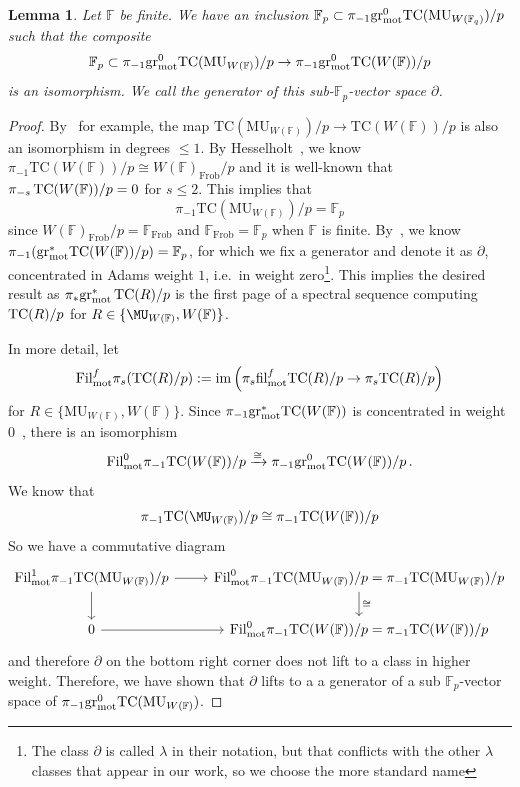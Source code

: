 \documentclass[english,10pt]{amsart}
\newcommand{\field}{\mathbb{F}}
\newtheorem{lemm}{Lemma}[section]
\theoremstyle{definition}
\numberwithin{equation}{section}
\newcommand{\mot}{\textup{mot}}
\DeclareMathOperator{\tc}{\ensuremath{\textup{TC}}}
\newcommand{\Fil}{\mathrm{Fil}}
\newcommand{\grmot}{\mathrm{gr}_{\textup{mot}}^*}
\newcommand{\pis}{\pi_*}
\begin{document}
\begin{lemm}\label{lem-partial}
Let $\mathbb{F}$ be finite. 
We have an inclusion 
$\field_p\subset \pi_{-1}\mathrm{gr}_{\textup{mot}}^0\mathrm{TC}(\mathrm{MU}_{W(\field_q)})/p$ such that the composite 
\[\field_p\subset \pi_{-1}\mathrm{gr}_{\textup{mot}}^0\mathrm{TC}(\mathrm{MU}_{W(\field)})/p\to \pi_{-1}\mathrm{gr}_{\textup{mot}}^0\mathrm{TC}(W(\field))/p\]
is an isomorphism. We call the generator of this sub-$\mathbb{F}_p$-vector space $\partial$. 
\end{lemm}
\begin{proof}
By~\cite[Proposition~3.22]{Kee25} for example, the map $\mathrm{TC}(\mathrm{MU}_{W(\field)})/p\to \mathrm{TC}(W(\field))/p$ is also an isomorphism in degrees $\le 1$. By Hesselholt~\cite[Theorem~A]{Hes97}, we know $\pi_{-1}\mathrm{TC}(W(\field))/p\cong W(\field)_{\mathrm{Frob}}/p$ and it is well-known that $\pi_{-s} \tc(W(\field))/p = 0$ for $s\le 2$. This implies that \[\pi_{-1}\mathrm{TC}(\mathrm{MU}_{W(\field)})/p=\mathbb{F}_p\]
since $W(\field)_{\mathrm{Frob}}/p=\mathbb{F}_{\mathrm{Frob}}$ and $\mathbb{F}_{\mathrm{Frob}}=\mathbb{F}_p$ when $\mathbb{F}$ is finite. By~\cite[Theorem~1.5]{LW22}, we know $\pi_{-1}(\grmot\mathrm{TC}(W(\field))/p)=\mathbb{F}_p$, for which we fix a generator and denote it  as $\partial$, concentrated in Adams weight $1$, i.e.\ in weight zero\footnote{The class $\partial$ is called $\lambda$ in their notation, but that conflicts with the other $\lambda$ classes that appear in our work, so we choose the more standard name}. This implies the desired result as $\pis \grmot \tc(R)/p$ is the first page of a spectral sequence computing $\tc(R)/p$ for $R \in \{\MU_{W(\field)}, W(\field)\}$. 

In more detail, let 
\[ 
\mathrm{Fil}_{\mot}^{f}\pi_s(\mathrm{TC}(R)/p) := \mathrm{im}\left (\pi_s\mathrm{fil}_{\textup{mot}}^f \mathrm{TC}(R)/p\to \pi_s\mathrm{TC}(R)/p\right ) \]
for $R\in \{ \mathrm{MU}_{W(\field)}, W(\field)\}$. 
Since $\pi_{-1}\grmot\mathrm{TC}(W(\field))$ is concentrated in weight $0$~\cite[Theorem~1.5]{LW22}, there is an isomorphism
\[ 
\mathrm{Fil}_{\textup{mot}}^0\pi_{-1}\mathrm{TC}(W(\field))/p\xrightarrow{\cong} \pi_{-1}\mathrm{gr}_{\textup{mot}}^0\mathrm{TC}(W(\field))/p\,.
\] 
We know that 
\[ 
\pi_{-1}\mathrm{TC}(\MU_{W(\field)})/p\cong \pi_{-1}\mathrm{TC}(W(\field))/p
\]
So we have a commutative diagram 
\[ 
\begin{tikzcd}
\Fil_{\mot}^1\pi_{-1}\mathrm{TC}(\mathrm{MU}_{W(\field)})/p   \arrow{d}  \arrow{r} & \Fil_{\mot}^0\pi_{-1}\mathrm{TC}(\mathrm{MU}_{W(\field)})/p=\pi_{-1}\mathrm{TC}(\mathrm{MU}_{W(\field)})/p \arrow{d}{\cong} \\ 
0 \arrow{r} & \Fil_{\mot}^0\pi_{-1}\mathrm{TC}(W(\field))/p=\pi_{-1}\mathrm{TC}(W(\field))/p
\end{tikzcd}
\] 
and therefore $\partial$ on the bottom right corner does not lift  to a class in higher weight. Therefore, we have shown that $\partial$ lifts to a a generator of a sub $\mathbb{F}_p$-vector space of $\pi_{-1}\mathrm{gr}_{\textup{mot}}^{0}\mathrm{TC}(\mathrm{MU}_{W(\field)})$.
\end{proof}
\end{document}
